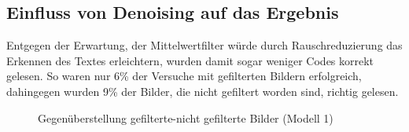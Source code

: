 		\subsection{Einfluss von Denoising auf das Ergebnis}
		\label{sub:influence-of-denoising}
			Entgegen der Erwartung, der Mittelwertfilter würde durch Rauschreduzierung das Erkennen des Textes erleichtern, wurden damit sogar weniger Codes korrekt gelesen. So waren nur 6\% der Versuche mit gefilterten Bildern erfolgreich, dahingegen wurden 9\% der Bilder, die nicht gefiltert worden sind, richtig gelesen. 
			\begin{figure}[H]
				\centering
				
				\caption{Gegenüberstellung gefilterte-nicht gefilterte Bilder (Modell 1) }
				\label{fig:denoise-compare1}
			\end{figure}
